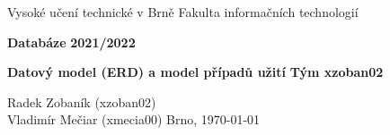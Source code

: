 \documentclass[12pt,a4paper]{article}
\begin{document}
    \pagestyle{empty}
    \begin{titlepage}
        \begin{center}
            \normalsize{Vysoké učení technické v Brně\linebreak}
            \normalsize{Fakulta informačních technologií}

            \vfill

            \large\textbf{Databáze\linebreak}
            \large\textbf{2021/2022}

            \vfill

            \LARGE\textbf{Datový model (ERD) a model případů užití\linebreak}
            \large\textbf{Tým xzoban02}

            \vfill
            \vfill
            \vfill


            \begin{flushleft}
                \large
                Radek Zobaník (xzoban02)\\
                Vladimír Mečiar (xmecia00)
                \hfill
                Brno, \today
            \end{flushleft}
        \end{center}
    \end{titlepage}
    \pagestyle{plain}
    \newpage

    
    
    
\end{document}
